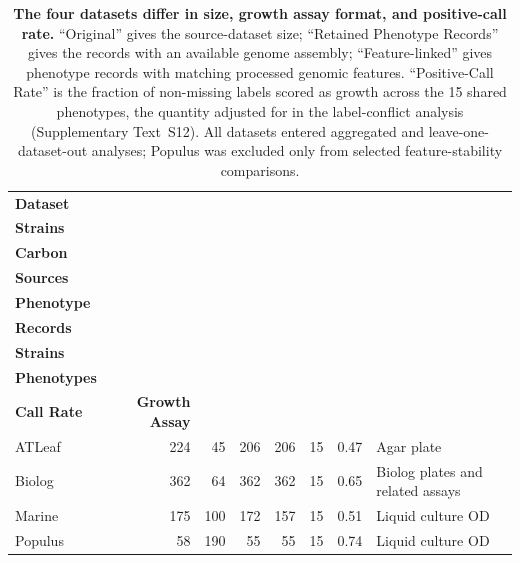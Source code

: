 \begin{table}[p]
\centering
\small
\setlength{\tabcolsep}{4pt}
\begin{tabularx}{\textwidth}{lrrrrrrX}
\hline
\textbf{Dataset} & \makecell[r]{\textbf{Original} \\ \textbf{Strains}} & \makecell[r]{\textbf{Original} \\ \textbf{Carbon} \\ \textbf{Sources}} & \makecell[r]{\textbf{Retained} \\ \textbf{Phenotype} \\ \textbf{Records}} & \makecell[r]{\textbf{Feature-linked} \\ \textbf{Strains}} & \makecell[r]{\textbf{Shared} \\ \textbf{Phenotypes}} & \makecell[r]{\textbf{Positive-} \\ \textbf{Call Rate}} & \textbf{Growth Assay} \\
\hline
ATLeaf  & 224 & 45  & 206 & 206 & 15 & 0.47 & Agar plate \\
Biolog  & 362 & 64  & 362 & 362 & 15 & 0.65 & Biolog plates and related assays \\
Marine  & 175 & 100 & 172 & 157 & 15 & 0.51 & Liquid culture OD \\
Populus & 58  & 190 & 55  & 55  & 15 & 0.74 & Liquid culture OD \\
\hline
\end{tabularx}
\caption{\textbf{The four datasets differ in size, growth assay format, and positive-call rate.}
``Original'' gives the source-dataset size; ``Retained Phenotype Records'' gives the records with an available genome assembly; ``Feature-linked'' gives phenotype records with matching processed genomic features.
``Positive-Call Rate'' is the fraction of non-missing labels scored as growth across the 15 shared phenotypes, the quantity adjusted for in the label-conflict analysis (Supplementary Text~S12).
All datasets entered aggregated and leave-one-dataset-out analyses; Populus was excluded only from selected feature-stability comparisons.}
\label{tab:dataset_overview}
\end{table}
\clearpage

